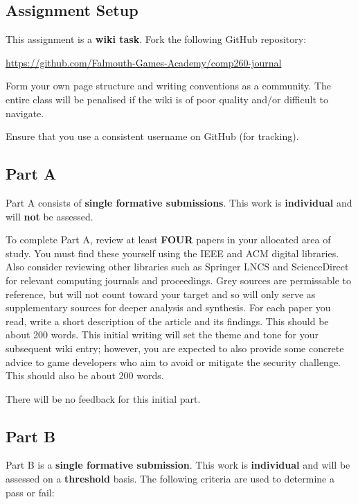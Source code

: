 \documentclass{../../fal_assignment}
\begin{document}
\subsection*{Assignment Setup}

This assignment is a \textbf{wiki task}. Fork the following GitHub repository:

\indent \url{https://github.com/Falmouth-Games-Academy/comp260-journal}

Form your own page structure and writing conventions as a community. The entire class will be penalised if the wiki is of poor quality and/or difficult to navigate. 

Ensure that you use a consistent username on GitHub (for tracking).

\subsection*{Part A}

Part A consists of \textbf{single formative submissions}. This work is \textbf{individual} and will \textbf{not} be assessed.

To complete Part A, review at least \textbf{FOUR} papers in your allocated area of study.
You must find these yourself using the IEEE and ACM digital libraries. Also consider reviewing other
libraries such as Springer LNCS and ScienceDirect for relevant computing journals and proceedings.
Grey sources are permissable to reference, but will not count toward your target and so will only serve as supplementary sources for deeper analysis and synthesis.
For each paper you read, write a short description of the article and its findings. This should be about 200 words.
This initial writing will set the theme and tone for your subsequent wiki entry;
however, you are expected to also provide some concrete advice to game developers who aim to avoid or mitigate the security challenge. This should also be about 200 words.

There will be no feedback for this initial part.

\subsection*{Part B}

Part B is a \textbf{single formative submission}. This work is \textbf{individual} and will be assessed on a \textbf{threshold} basis. The following criteria are used to determine a pass or fail:
\end{document}
